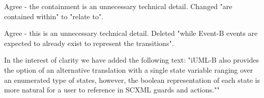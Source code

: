 \documentclass{response}
\begin{document}
\begin{response}
	Agree - the containment is an unnecessary technical detail. Changed "are contained within" to "relate to".
\end{response}

\begin{comment}{Reviewer \#3}
Page 4:
  and this as well:

 "while Event-B events are expected to already exist to represent the transitions."
\end{comment}

\begin{response}
	Agree - this is an unnecessary technical detail. Deleted  "while Event-B events are expected to already exist to represent the transitions".
\end{response}

\begin{comment}{Reviewer \#3}
  Page 5:

  * It would seem more natural to have one state variable ranging over
  an enumerated type of states, rather than having a Boolean flag for
  each state.
\end{comment}
  
  \begin{response}
    In the interest of clarity we have added the following text: "iUML-B also provides the option of an alternative translation with a single state variable ranging over an enumerated type of states, however, the boolean representation of each state is more natural for a user to reference in SCXML guards and actions.""
  \end{response}
  
\begin{comment}{Reviewer \#3}

  * Section 3: be more clear about what this system does. Is it just a
  buzz that goes off when a sensor senses something?
\end{comment}

\begin{response}
\end{response}
\end{document}
